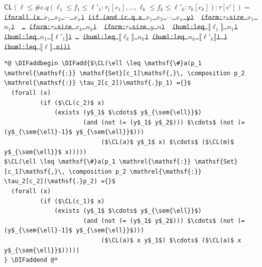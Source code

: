 \documentclass[10pt,fleqn,final]{scrreprt}
\newcommand*{\CL}{\ensuremath{\mathsf{CL}}\xspace}
\newcommand{\composition}{\raisebox{0.2pt}{\begin{sideways}\fontsize{6pt}{6pt}\selectfont$\blacklozenge$\end{sideways}}}
\newcommand{\sem}[1]{\mathopen\llbracket#1\mathclose\rrbracket}
\newcommand{\white}[1]{{\color{white}{#1}}}
\newcommand{\qqquad}{\white{x}\qquad}
\providecommand{\DIFadd}[1]{{\protect\color{blue}\uwave{#1}}} %
\providecommand{\DIFdel}[1]{{\protect\color{red}\sout{#1}}}                      %
\providecommand{\DIFaddbegin}{} %
\providecommand{\DIFaddend}{} %
\providecommand{\DIFdelend}{} %
\begin{document}
\DIFdel{$\CL(\ell \leq \mathsf{\#}c.q(\ell_1 \leq f_1 \leq \ell'_1: \tau_1[c_1], \ldots, \ell_k\leq f_k \leq \ell'_k: \tau_k[c_k]) : \tau[c'])=$}%
\texttt{\DIFdel{(forall (x $x_1$ $x_2$ $\cdots$  $x_n$)}%
\DIFdel{(if (and (c.q x $x_1$ $x_2$ $\cdots$  $x_n$ y) }%
\DIFdel{(form:$\tau$-size $x_1$ $n_1$) }%
\DIFdel{\ldots}%
\DIFdel{(form:$\tau$-size $x_k$ $n_k$) }%
\DIFdel{(form:$\tau$-size $y$ $n$) }%
\DIFdel{(buml:leq $\sem{\ell_1}$ $n_1$)}%
\DIFdel{(buml:leq $n_1$ $\sem{\ell'_1}$)}%
\DIFdel{\ldots}%
\DIFdel{(buml:leq $\sem{\ell_k}$ $n_k$)}%
\DIFdel{(buml:leq $n_k$ $\sem{\ell'_k}$) )}%
\DIFdel{(buml:leq $\sem{\ell}$ n)))}}
\DIFdelend %
 \begin{lstlisting}[language=clif, mathescape]
*@ \DIFaddbegin \DIFadd{$\CL(\ell \leq \mathsf{\#}a(p_1 \mathrel{\mathsf{:}} \mathsf{Set}[c_1]\mathsf{,}\, \composition p_2 \mathrel{\mathsf{:}} \tau_2[c_2])\mathsf{.}p_1) ={}$
  (forall (x)
          (if ($\CL(c_2)$ x)
              (exists (y$_1$ $\cdots$ y$_{\sem{\ell}}$)
                      (and (not (= (y$_1$ y$_2$))) $\cdots$ (not (= (y$_{\sem{\ell}-1}$ y$_{\sem{\ell}}$)))
                           ($\CL(a)$ y$_1$ x) $\cdots$ ($\CL(m)$ y$_{\sem{\ell}}$ x)))))
$\CL(\ell \leq \mathsf{\#}a(p_1 \mathrel{\mathsf{:}} \mathsf{Set}[c_1]\mathsf{,}\, \composition p_2 \mathrel{\mathsf{:}} \tau_2[c_2])\mathsf{.}p_2) ={}$
  (forall (x)
          (if ($\CL(c_1)$ x)
              (exists (y$_1$ $\cdots$ y$_{\sem{\ell}}$)
                      (and (not (= (y$_1$ y$_2$))) $\cdots$ (not (= (y$_{\sem{\ell}-1}$ y$_{\sem{\ell}}$)))
                           ($\CL(a)$ x y$_1$) $\cdots$ ($\CL(a)$ x y$_{\sem{\ell}}$)))))
} \DIFaddend @*
\end{lstlisting}
\end{document}
